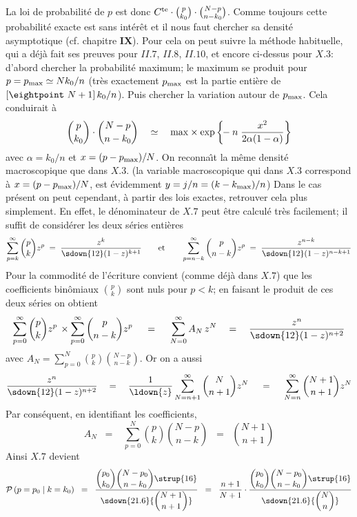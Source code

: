 La loi de probabilit\'e de $p$ est donc $C^{\rm te} \cdot {p\choose k_0} 
\cdot {N-p \choose n-k_0}$.  
Comme toujours cette probabilit\'e {\og exacte\fg} est sans int\'er\^et et
il nous faut chercher sa densit\'e asymptotique (cf. chapitre {\bf IX}). 
Pour cela on peut suivre la m\'ethode habituelle,  qui a d\'ej\`a fait ses
preuves pour $II.7$, $II.8$, $II.10$, et encore ci-dessus pour $X.3$: 
d'abord chercher la probabilit\'e maximum; le maximum se produit pour $p = 
p_{\rm max}  \simeq N k_0/n$  (tr\`es exactement $p_{\rm max}$ est la 
partie enti\`ere de $[\hbox{\eightpoint $N$}+1]\, k_0/n$).  Puis chercher la 
variation autour de $p_{\rm max}$. Cela conduirait \`a   
$${p\choose k_0} \cdot {N-p \choose n-k_0} \quad \simeq \quad {\rm max}\times
\exp \bigg\{\!\! - n\; {x^2 \over 2 \alpha (1-\alpha )} \bigg\}$$  
avec $\alpha = k_0/n$ et $x = (p - p_{\rm max})/N$.  
On reconna{\^\i}t la m\^eme densit\'e macroscopique que dans $X.3$. 
(la variable macroscopique qui dans $X.3$ correspond \`a $x =  
(p - p_{\rm max})/N$, est \'evidemment $y=j/n=(k-k_{\rm max})/n$) 
\medskip 
Dans le cas pr\'esent on peut cependant, \`a partir des lois exactes,  
retrouver cela plus simplement. En effet, le d\'enominateur de $X.7$
peut \^etre calcul\'e tr\`es facilement; il suffit de consid\'erer les 
deux s\'eries enti\`eres  
$$\sum_{p=k}^\infty {p \choose k} z^p \; = \; {z^k \over \sdown{12}  
(1-z)^{k+1}} \qquad \hbox{et} \qquad \sum_{p=n-k}^\infty {p \choose  
n-k} z^p \; = \; {z^{n-k} \over \sdown{12} (1-z)^{n-k+1}}$$ 
Pour la commodit\'e de l'\'ecriture convient (comme d\'ej\`a dans $X.7$)
que les coefficients bin\^omiaux ${p\choose k}$ sont nuls pour $p < k$; 
en faisant le produit de ces deux s\'eries on obtient  
$$\sum_{p=0}^\infty {p \choose k} z^p\, \times 
\sum_{p=0}^\infty {p  \choose n-k} z^p\; \quad = \quad\; \sum_{N=0}^\infty 
A_N\, z^N \quad = \quad {z^{n} \over\sdown{12}  (1-z)^{n+2}}$$  
avec $\displaystyle A_N = \sum_{p=0}^N {p \choose k}{N-p 
\choose n-k}$. Or on a aussi 
$${z^{n} \over \sdown{12} (1-z)^{n+2}} \quad = \quad {1\over \ldown{z}} 
\sum_{N=n+1}^\infty {N \choose n+1} z^{N}\;\quad = \quad\; \sum_{N=n}^\infty
{N + 1 \choose n+1} z^{N}$$ 
Par cons\'equent, en identifiant les coefficients,  
$$A_N \;\; = \;\;\; \sum_{p=0}^N {p \choose k}{N-p \choose n-k}
\;\; = \;\; {N + 1 \choose n+1}$$ 
Ainsi $X.7$ devient 
$${\cal P}\, (p=p_0 \mid k=k_0)\;\; = \;\; {{\displaystyle {p_0 \choose  
k_0} {N-p_0\choose n-k_0}}\strup{16}\over\sdown{21.6}{\displaystyle  
{N+1 \choose n+1}} } \;\; = \;\; {n+1 \over N+1} \cdot {{\displaystyle
{p_0 \choose k_0} {N-p_0 \choose n-k_0}} \strup{16} \over \sdown{21.6} 
{\displaystyle  {N \choose n}} }$$ 
